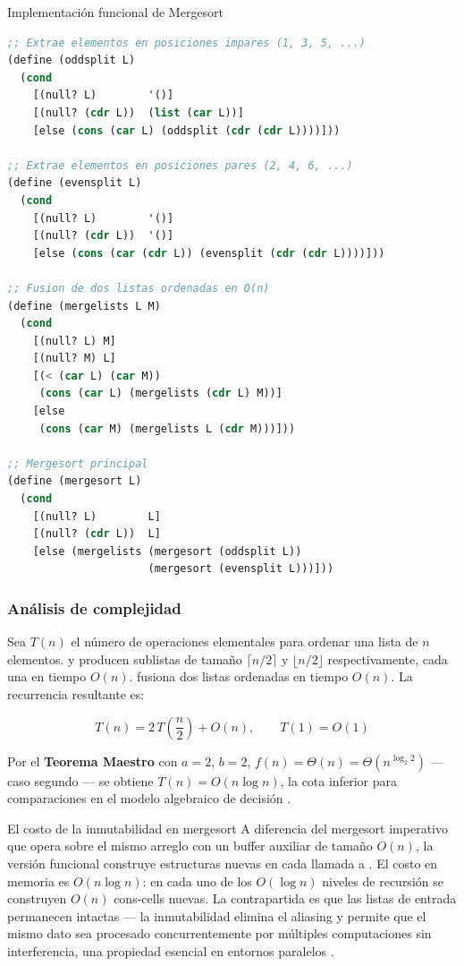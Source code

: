 \begin{definicion}{Implementación funcional de Mergesort}
\begin{lstlisting}[language=Lisp, caption={Mergesort funcional sobre listas enlazadas}]
;; Extrae elementos en posiciones impares (1, 3, 5, ...)
(define (oddsplit L)
  (cond
    [(null? L)        '()]
    [(null? (cdr L))  (list (car L))]
    [else (cons (car L) (oddsplit (cdr (cdr L))))]))

;; Extrae elementos en posiciones pares (2, 4, 6, ...)
(define (evensplit L)
  (cond
    [(null? L)        '()]
    [(null? (cdr L))  '()]
    [else (cons (car (cdr L)) (evensplit (cdr (cdr L))))]))

;; Fusion de dos listas ordenadas en O(n)
(define (mergelists L M)
  (cond
    [(null? L) M]
    [(null? M) L]
    [(< (car L) (car M))
     (cons (car L) (mergelists (cdr L) M))]
    [else
     (cons (car M) (mergelists L (cdr M)))]))

;; Mergesort principal
(define (mergesort L)
  (cond
    [(null? L)        L]
    [(null? (cdr L))  L]
    [else (mergelists (mergesort (oddsplit L))
                      (mergesort (evensplit L)))]))
\end{lstlisting}
\end{definicion}

\subsubsection*{Análisis de complejidad}

Sea $T(n)$ el número de operaciones elementales para ordenar una lista de $n$ elementos.  y  producen sublistas de tamaño $\lceil n/2 \rceil$ y $\lfloor n/2 \rfloor$ respectivamente, cada una en tiempo $O(n)$.  fusiona dos listas ordenadas en tiempo $O(n)$. La recurrencia resultante es:

\begin{equation}
    T(n) = 2\,T\!\left(\frac{n}{2}\right) + O(n), \qquad T(1) = O(1)
\end{equation}

Por el \textbf{Teorema Maestro} con $a = 2$, $b = 2$, $f(n) = \Theta(n) = \Theta(n^{\log_2 2})$ — caso segundo — se obtiene $T(n) = O(n \log n)$, la cota inferior para comparaciones en el modelo algebraico de decisión \cite{PFPL}.

\begin{observacion}{El costo de la inmutabilidad en mergesort}
A diferencia del mergesort imperativo que opera sobre el mismo arreglo con un buffer auxiliar de tamaño $O(n)$, la versión funcional construye estructuras nuevas en cada llamada a . El costo en memoria es $O(n \log n)$: en cada uno de los $O(\log n)$ niveles de recursión se construyen $O(n)$ cons-cells nuevas. La contrapartida es que las listas de entrada permanecen intactas — la inmutabilidad elimina el aliasing y permite que el mismo dato sea procesado concurrentemente por múltiples computaciones sin interferencia, una propiedad esencial en entornos paralelos \cite{SICP}.
\end{observacion}

